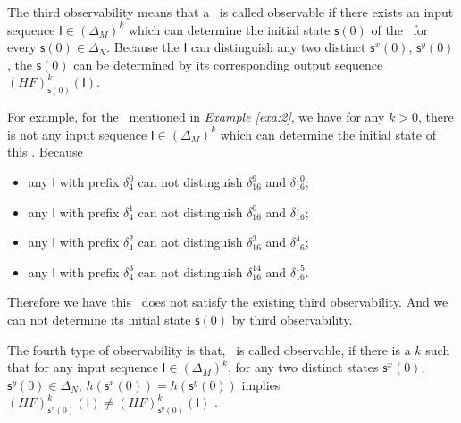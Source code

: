 The third observability means that a \BCN\ is called observable if there exists an input sequence $\mathsf{I}\in(\Delta_M)^k$ which can determine the initial state $\mathsf{s}(0)$ of the \BCN\ for every $\mathsf{s}(0)\in\Delta_N$. Because the $\mathsf{I}$ can distinguish any two distinct $\mathsf{s}^{x}(0)$, $\mathsf{s}^{y}(0)$, the $\mathsf{s}(0)$ can be determined by its corresponding output sequence $(HF)^k_{\mathsf{s}(0)}(\mathsf{I})$.

\begin{example}
For example, for the \BCN\ mentioned in {\em Example \ref{exa:2}}, we have for any $k>0$, there is not any input sequence $\mathsf{I}\in(\Delta_M)^k$ which can determine the initial state of this \BCN. Because 
\begin{itemize}
  \item any $\mathsf{I}$ with prefix $\delta_{4}^0$ can not distinguish $\delta_{16}^9$ and $\delta_{16}^{10}$;
  \item any $\mathsf{I}$ with prefix $\delta_{4}^1$ can not distinguish $\delta_{16}^0$ and $\delta_{16}^{1}$;
  \item any $\mathsf{I}$ with prefix $\delta_{4}^2$ can not distinguish $\delta_{16}^3$ and $\delta_{16}^{4}$;
  \item any $\mathsf{I}$ with prefix $\delta_{4}^3$ can not distinguish $\delta_{16}^{14}$ and $\delta_{16}^{15}$.
\end{itemize} 



Therefore we have this \BCN\ does not satisfy the existing third observability. And we can not determine its initial state $\mathsf{s}(0)$ by third observability. 
\label{exa:6}
\end{example}  
\begin{definition}
	The fourth type of observability is that, \BCN\ is called observable, if there is a $k$ such that for any input sequence $\mathsf{I}\in(\Delta_M)^{k}$, for any two distinct states $\mathsf{s}^{x}(0)$, $\mathsf{s}^{y}(0) \in \Delta_N$, $h(\mathsf{s}^{x}(0))=h(\mathsf{s}^{y}(0))$ implies $(HF)^{k}_{\mathsf{s}^{x}(0)}(\mathsf{I})\neq (HF)^{k}_{\mathsf{s}^{y}(0)}(\mathsf{I})$ \cite{Fornasini2013Observability}.
\end{definition}

